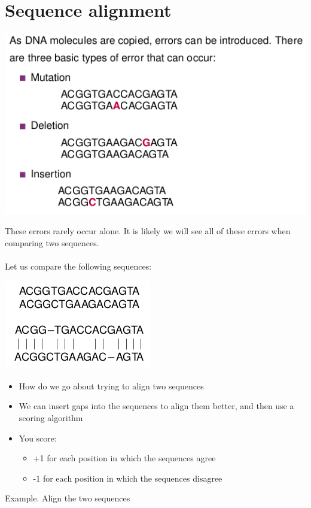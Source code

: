 \documentclass{article}[18pt]
\begin{document}
\section{Sequence alignment}
\begin{center}
	\includegraphics[scale=0.7]{sequence_alignment}
\end{center}
These errors rarely occur alone. It is likely we will see all of these errors when comparing two sequences.\\
\\
Let us compare the following sequences:
\begin{center}
	\includegraphics[scale=0.7]{alignment}
\end{center}
\begin{itemize}
	\item How do we go about trying to align two sequences
	\item We can insert gaps into the sequences to align them better, and then use a scoring algorithm
	\item You score:
	\begin{itemize}
		\item +1 for each position in which the sequences agree
		\item -1 for each position in which the sequences disagree
	\end{itemize}
\end{itemize}
Example. Align the two sequences
\end{document}
